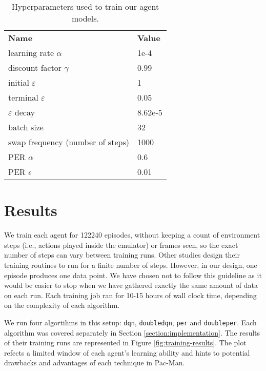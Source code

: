 \begin{table}
    \centering
        \begin{tabular}{ll}
            \textbf{Name}                  & \textbf{Value}   \\
            learning rate $\alpha$             & 1e-4    \\
            discount factor $\gamma$           & 0.99    \\
            initial $\varepsilon$              & 1       \\
            terminal $\varepsilon$             & 0.05    \\
            $\varepsilon$ decay                & 8.62e-5 \\
            batch size                         & 32      \\
            swap frequency (number of steps)   & 1000    \\
            PER $\alpha$                       & 0.6     \\
            PER $\epsilon$                     & 0.01    \\
        \end{tabular}%
        \caption{Hyperparameters used to train our agent models.}
    \label{tab:our-hyperparameters}
\end{table}

\section*{Results}
We train each agent for \num{122240} episodes, without keeping a count of environment steps (i.e., actions played inside the emulator) or frames seen, so the exact number of steps can vary between training runs.
Other studies design their training routines to run for a finite number of steps.
However, in our design, one episode produces one data point. We have chosen not to follow this guideline as it would be easier to stop when we have gathered exactly the same amount of data on each run.
Each training job ran for 10-15 hours of wall clock time, depending on the complexity of each algorithm.

We run four algortihms in this setup: \texttt{dqn}, \texttt{doubledqn}, \texttt{per} and \texttt{doubleper}.
Each algorithm was covered separately in Section \ref{section:implementation}.
The results of their training runs are represented in Figure \ref{fig:training-results}.
The plot refects a limited window of each agent's learning ability and hints to potential drawbacks and advantages of each technique in Pac-Man.

